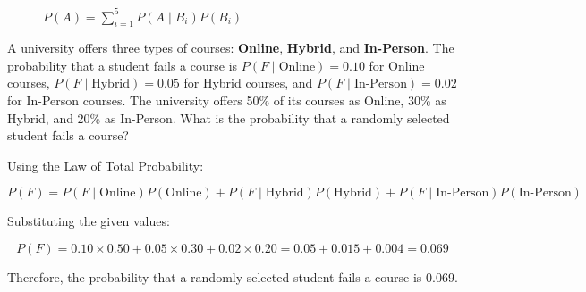 \begin{figure}[htbp]
    \centering
    \caption{$P(A) = \sum_{i=1}^{5} P(A \mid B_i) P(B_i)$}
    \label{fig:decoAmulB}
\end{figure}

\begin{example}
    A university offers three types of courses: \textbf{Online}, \textbf{Hybrid}, and \textbf{In-Person}. The probability that a student fails a course is \( P(F \mid \text{Online}) = 0.10 \) for Online courses, \( P(F \mid \text{Hybrid}) = 0.05 \) for Hybrid courses, and \( P(F \mid \text{In-Person}) = 0.02 \) for In-Person courses. The university offers 50\% of its courses as Online, 30\% as Hybrid, and 20\% as In-Person. What is the probability that a randomly selected student fails a course?
\end{example}

\begin{solution}
    Using the Law of Total Probability:

    \[
    P(F) = P(F \mid \text{Online}) P(\text{Online}) + P(F \mid \text{Hybrid}) P(\text{Hybrid}) + P(F \mid \text{In-Person}) P(\text{In-Person})
    \]

    Substituting the given values:

    \[
    P(F) = 0.10 \times 0.50 + 0.05 \times 0.30 + 0.02 \times 0.20 = 0.05 + 0.015 + 0.004 = 0.069
    \]

    Therefore, the probability that a randomly selected student fails a course is 0.069.
\leavevmode\end{solution}

